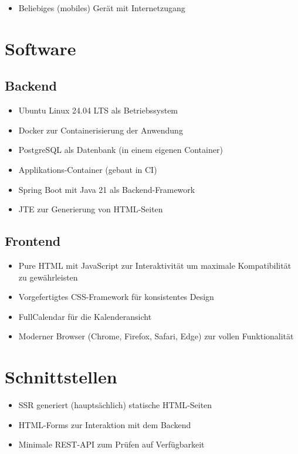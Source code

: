 \begin{itemize}
    \item Beliebiges (mobiles) Gerät mit Internetzugang
\end{itemize}

\section{Software}

\subsection{Backend}

\begin{itemize}
    \item Ubuntu Linux 24.04 LTS als Betriebssystem
    \item \gls{Docker} zur \gls{Container}isierung der Anwendung
    \item \gls{PostgreSQL} als Datenbank (in einem eigenen \gls{Container})
    \item Applikations-\gls{Container} (gebaut in \gls{CI})
    \item Spring Boot mit Java 21 als Backend-Framework
    \item JTE zur Generierung von \gls{HTML}-Seiten
\end{itemize}

\subsection{Frontend}

\begin{itemize}
    \item Pure \gls{HTML} mit \gls{JavaScript} zur Interaktivität um maximale Kompatibilität zu gewährleisten
    \item Vorgefertigtes \gls{CSS}-Framework für konsistentes Design
    \item FullCalendar für die Kalenderansicht
    \item Moderner \gls{Browser} (Chrome, Firefox, Safari, Edge) zur vollen Funktionalität
\end{itemize}

\section{Schnittstellen}

\begin{itemize}
    \item \gls{SSR} generiert (hauptsächlich) statische \gls{HTML}-Seiten
    \item \gls{HTML}-Forms zur Interaktion mit dem Backend
    \item Minimale \gls{REST}-\gls{API} zum Prüfen auf Verfügbarkeit
\end{itemize}